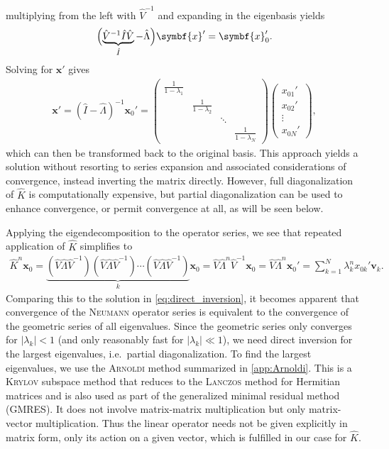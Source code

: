\documentclass[a4paper, twoside, 10pt, english]{article}
\numberwithin{equation}{section}
\let\vec\symbf
\begin{document}
multiplying from the left with $\hat{V}^{-1}$ and expanding in the eigenbasis yields
\begin{gather}
  \Bigl ( \underbrace{\hat{V}^{-1} \hat{I} \hat{V}}_{\hat{I}} - \hat{\Lambda} \Bigr ) \vec{x}' = \vec{x}_{0}'.
\end{gather}
Solving for $\vec{x}'$ gives
\begin{gather}
  \vec{x}' = \left ( \hat{I} - \hat{\Lambda} \right )^{-1} \vec{x}_{0}' = \begin{pmatrix}
    \frac{1}{1 - \lambda_{1}} & & & \\
    & \frac{1}{1 - \lambda_{2}} & & \\
    & & \ddots & \\
    & & & \frac{1}{1 - \lambda_{N}}
  \end{pmatrix} \begin{pmatrix} x_{01}' \\ x_{02}' \\ \vdots \\ x_{0N}' \end{pmatrix}, \label{eq:direct_inversion}
\end{gather}
which can then be transformed back to the original basis. This approach yields a solution without resorting to series expansion and associated considerations of convergence, instead inverting the matrix directly. However, full diagonalization of $\hat{K}$ is computationally expensive, but partial diagonalization can be used to enhance convergence, or permit convergence at all, as will be seen below.

Applying the eigendecomposition to the operator series, we see that repeated application of $\hat{K}$ simplifies to
\begin{gather}
  \hat{K}^{n} \vec{x}_{0} = \underbrace{\left ( \hat{V} \hat{\Lambda} \hat{V}^{-1} \right ) \left ( \hat{V} \hat{\Lambda} \hat{V}^{-1} \right ) \dotsb \left ( \hat{V} \hat{\Lambda} \hat{V}^{-1} \right )}_{k} \vec{x}_{0}= \hat{V} \hat{\Lambda}^{n} \hat{V}^{-1} \vec{x}_{0} = \hat{V} \hat{\Lambda}^{n} \vec{x}_{0}' = \sum_{k = 1}^{N} \lambda_{k}^{n} x_{0 k}' \vec{v}_{k}.
\end{gather}
Comparing this to the solution in \cref{eq:direct_inversion}, it becomes apparent that convergence of the \textsc{Neumann} operator series is equivalent to the convergence of the geometric series of all eigenvalues. Since the geometric series only converges for $\lvert \lambda_{k} \rvert < 1$ (and only reasonably fast for $\lvert \lambda_{k} \rvert \ll 1$), we need direct inversion for the largest eigenvalues, i.e.\ partial diagonalization. To find the largest eigenvalues, we use the \textsc{Arnoldi} method summarized in \cref{app:Arnoldi}. This is a \textsc{Krylov} subspace method that reduces to the \textsc{Lanczos} method for Hermitian matrices and is also used as part of the generalized minimal residual method (GMRES). It does not involve matrix-matrix multiplication but only matrix-vector multiplication. Thus the linear operator needs not be given explicitly in matrix form, only its action on a given vector, which is fulfilled in our case for $\hat{K}$.
\end{document}

